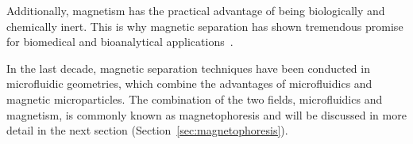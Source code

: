 Additionally, magnetism has the practical advantage of being biologically and chemically inert. This is why magnetic separation has shown tremendous promise for biomedical and bioanalytical applications~\cite{Gijs2004,Pankhurst2003}. 

In the last decade, magnetic separation techniques have been conducted in microfluidic geometries, which combine the advantages of microfluidics and magnetic microparticles. The combination of the two fields, microfluidics and magnetism, is commonly known as magnetophoresis and will be discussed in more detail in the next section (Section~\ref{sec:magnetophoresis}).



